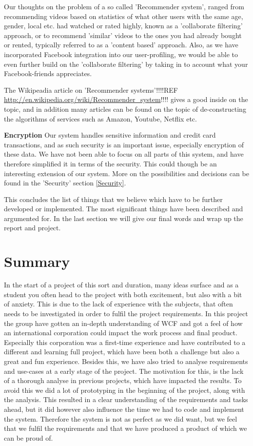 Our thoughts on the problem of a so called 'Recommender system', ranged from recommending videos based on statistics of what other users with the same age, gender, local etc. had watched or rated highly, known as a 'collaborate filtering' approach, or to recommend 'similar' videos to the ones you had already bought or rented, typically referred to as a 'content based' approach. Also, as we have incorporated Facebook integration into our user-profiling, we would be able to even further build on the 'collaborate filtering' by taking in to account what your Facebook-friends appreciates. \

The Wikipeadia article on 'Recommender systems'!!!!REF \url{http://en.wikipedia.org/wiki/Recommender_system}!!!! gives a good inside on the topic, and in addition many articles can be found on the topic of de-constructing the algorithms of services such as Amazon, Youtube, Netflix etc. \

\textbf{Encryption}
Our system handles sensitive information and credit card transactions, and as such security is an important issue, especially encryption of these data. We have not been able to focus on all parts of this system, and have therefore simplified it in terms of the security. This could though be an interesting extension of our system. More on the possibilities and decisions can be found in the 'Security' section \ref{Security}. \

This concludes the list of things that we believe which have to be further developed or implemented. The most significant things have been described and argumented for. In the last section we will give our final words and wrap up the report and project.

\newpage
\section{Summary}
In the start of a project of this sort and duration, many ideas surface and as a student you often head to the project with both excitement, but also with a bit of anxiety. This is due to the lack of experience with the subjects, that often needs to be investigated in order to fulfil the project requirements. In this project the group have gotten an in-depth understanding of WCF and got a feel of how an international corporation could impact the work process and final product. Especially this corporation was a first-time experience and have contributed to a different and learning full project, which have been both a challenge but also a great and fun experience. 
Besides this, we have also tried to analyse requirements and use-cases at a early stage of the project. The motivation for this, is the lack of a thorough analyse in previous projects, which have impacted the results. To avoid this we did a lot of prototyping in the beginning of the project, along with the analysis. This resulted in a clear understanding of the requirements and tasks ahead, but it did however also influence the time we had to code and implement the system. Therefore the system is not as perfect as we did want, but we feel that we fulfil the requirements and that we have produced a product of which we can be proud of.




 
